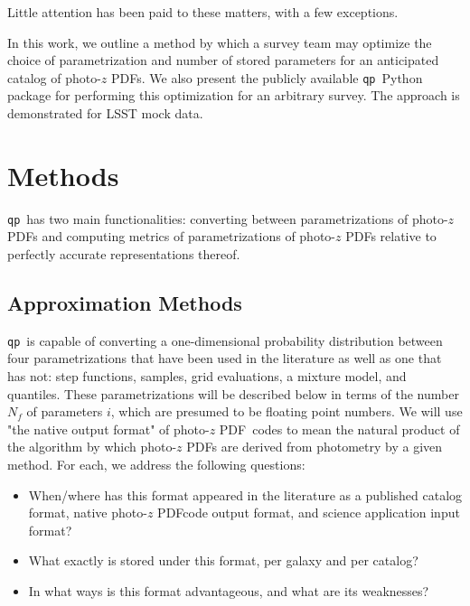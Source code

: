 \documentclass[\docopts]{\docclass}
\newcommand{\qp}{\texttt{qp}}
\newcommand{\pz}{photo-$z$ PDF}
\begin{document}
Little attention has been paid to these matters, with a few exceptions.  
\citep{carrasco_kind_sparse_2014}

In this work, we outline a method by which a survey team may optimize the 
choice of parametrization and number of stored parameters for an anticipated 
catalog of \pz s.  We also present the publicly available \qp\ Python package 
for performing this optimization for an arbitrary survey.  The approach is 
demonstrated for LSST mock data.








\section{Methods}
\label{sec:methods}



\qp\ has two main functionalities: converting between parametrizations of \pz s 
and computing metrics of parametrizations of \pz s relative to perfectly 
accurate representations thereof.

\subsection{Approximation Methods}
\label{sec:approx}


\qp\ is capable of converting a one-dimensional probability distribution 
between four parametrizations that have been used in the literature as well as 
one that has not: step functions, samples, grid evaluations, a mixture model, 
and quantiles.  These parametrizations will be described below in terms of the 
number $N_{f}$ of parameters $i$, which are presumed to be floating point 
numbers.  We will use "the native output format" of \pz\ codes to mean the 
natural product of the algorithm by which \pz s are derived from photometry by 
a given method.  For each, we address the following questions:

\begin{itemize}
  \item When/where has this format appeared in the literature as a published 
catalog format, native \pz code output format, and science application input 
format?
  \item What exactly is stored under this format, per galaxy and per catalog?
  \item In what ways is this format advantageous, and what are its weaknesses?
\end{itemize}
\end{document}
